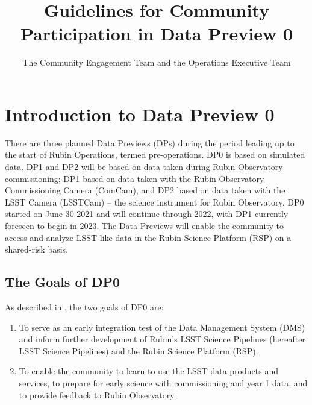 \documentclass[DM,lsstdraft,authoryear,toc]{lsstdoc}
\title{Guidelines for Community Participation in Data Preview 0}
\author{The Community Engagement Team and the Operations Executive Team}
\date{\vcsDate}
\begin{document}
\maketitle

\renewcommand{\thepage}{\arabic{page}}%

\setcounter{page}{1}%


\section{Introduction to Data Preview 0}\label{sec:intro}

There are three planned Data Previews (DPs) during the period leading up to the start of Rubin Operations, termed pre-operations.
DP0 is based on simulated data.
DP1 and DP2 will be based on data taken during Rubin Observatory commissioning; DP1 based on data taken with the Rubin Observatory Commissioning Camera (ComCam), and DP2 based on data taken with the LSST Camera (LSSTCam) -- the science instrument for Rubin Observatory.
DP0 started on June 30 2021 and will continue through 2022, with DP1 currently foreseen to begin in 2023.
The Data Previews will enable the community to access and analyze LSST-like data in the Rubin Science Platform (RSP) on a shared-risk basis. 


\subsection{The Goals of DP0}\label{ssec:intro_goals}

As described in , the two goals of DP0 are:
\begin{enumerate}
\item To serve as an early integration test of the Data Management System (DMS) and inform further development of Rubin's LSST Science Pipelines (hereafter LSST Science Pipelines) and the Rubin Science Platform (RSP).
\item To enable the community to learn to use the LSST data products and services, to prepare for early science with commissioning and year 1 data, and to provide feedback to Rubin Observatory. 
\end{enumerate}
\end{document}
